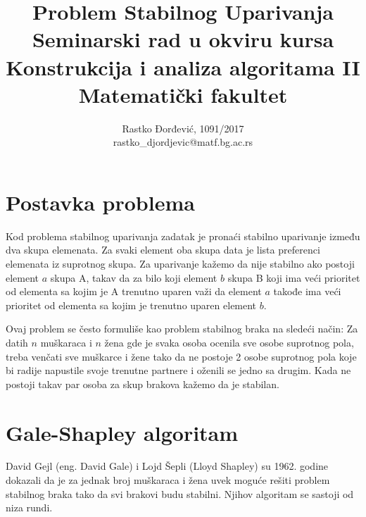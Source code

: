 \documentclass[a4paper]{article}
\begin{document}
\title{Problem Stabilnog Uparivanja\\ \small{Seminarski rad u okviru kursa\\Konstrukcija i analiza algoritama II\\ Matematički fakultet}}

\author{Rastko Đorđević, 1091/2017\\ rastko\_djordjevic@matf.bg.ac.rs}
\maketitle


\tableofcontents

\newpage



\section{Postavka problema}

Kod problema stabilnog uparivanja zadatak je pronaći stabilno uparivanje između dva skupa elemenata. Za svaki element oba skupa data je lista preferenci elemenata iz suprotnog skupa. Za uparivanje kažemo da nije stabilno ako postoji element $a$ skupa A, takav da za bilo koji element $b$ skupa B koji ima veći prioritet od elementa sa kojim je A trenutno uparen važi da element $a$ takođe ima veći prioritet od elementa sa kojim je trenutno uparen element $b$. 

Ovaj problem se često formuliše kao problem stabilnog braka na sledeći način:
Za datih $n$ muškaraca i $n$ žena gde je svaka osoba ocenila sve osobe suprotnog pola, treba venčati sve muškarce i žene tako da ne postoje 2 osobe suprotnog pola koje bi radije napustile svoje trenutne partnere i oženili se jedno sa drugim. Kada ne postoji takav par osoba za skup brakova kažemo da je stabilan.

\section{Gale-Shapley algoritam}

David Gejl (eng. David Gale) i Lojd Šepli (Lloyd Shapley) su 1962. godine dokazali da je za jednak broj muškaraca i žena uvek moguće rešiti problem stabilnog braka tako da svi brakovi budu stabilni. Njihov algoritam se sastoji od niza rundi.
\end{document}
